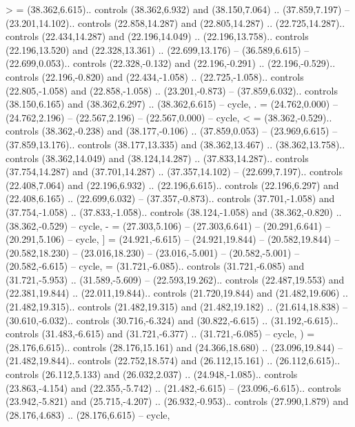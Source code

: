 {>} = {(38.362,6.615).. controls (38.362,6.932) and (38.150,7.064) .. (37.859,7.197) -- (23.201,14.102).. controls (22.858,14.287) and (22.805,14.287) .. (22.725,14.287).. controls (22.434,14.287) and (22.196,14.049) .. (22.196,13.758).. controls (22.196,13.520) and (22.328,13.361) .. (22.699,13.176) -- (36.589,6.615) -- (22.699,0.053).. controls (22.328,-0.132) and (22.196,-0.291) .. (22.196,-0.529).. controls (22.196,-0.820) and (22.434,-1.058) .. (22.725,-1.058).. controls (22.805,-1.058) and (22.858,-1.058) .. (23.201,-0.873) -- (37.859,6.032).. controls (38.150,6.165) and (38.362,6.297) .. (38.362,6.615) -- cycle},
{.} = {(24.762,0.000) -- (24.762,2.196) -- (22.567,2.196) -- (22.567,0.000) -- cycle},
{<} = {(38.362,-0.529).. controls (38.362,-0.238) and (38.177,-0.106) .. (37.859,0.053) -- (23.969,6.615) -- (37.859,13.176).. controls (38.177,13.335) and (38.362,13.467) .. (38.362,13.758).. controls (38.362,14.049) and (38.124,14.287) .. (37.833,14.287).. controls (37.754,14.287) and (37.701,14.287) .. (37.357,14.102) -- (22.699,7.197).. controls (22.408,7.064) and (22.196,6.932) .. (22.196,6.615).. controls (22.196,6.297) and (22.408,6.165) .. (22.699,6.032) -- (37.357,-0.873).. controls (37.701,-1.058) and (37.754,-1.058) .. (37.833,-1.058).. controls (38.124,-1.058) and (38.362,-0.820) .. (38.362,-0.529) -- cycle},
{-} = {(27.303,5.106) -- (27.303,6.641) -- (20.291,6.641) -- (20.291,5.106) -- cycle},
{]} = {(24.921,-6.615) -- (24.921,19.844) -- (20.582,19.844) -- (20.582,18.230) -- (23.016,18.230) -- (23.016,-5.001) -- (20.582,-5.001) -- (20.582,-6.615) -- cycle},
{\ctpbackslash} = {(31.721,-6.085).. controls (31.721,-6.085) and (31.721,-5.953) .. (31.589,-5.609) -- (22.593,19.262).. controls (22.487,19.553) and (22.381,19.844) .. (22.011,19.844).. controls (21.720,19.844) and (21.482,19.606) .. (21.482,19.315).. controls (21.482,19.315) and (21.482,19.182) .. (21.614,18.838) -- (30.610,-6.032).. controls (30.716,-6.324) and (30.822,-6.615) .. (31.192,-6.615).. controls (31.483,-6.615) and (31.721,-6.377) .. (31.721,-6.085) -- cycle},
{)} = {(28.176,6.615).. controls (28.176,15.161) and (24.366,18.680) .. (23.096,19.844) -- (21.482,19.844).. controls (22.752,18.574) and (26.112,15.161) .. (26.112,6.615).. controls (26.112,5.133) and (26.032,2.037) .. (24.948,-1.085).. controls (23.863,-4.154) and (22.355,-5.742) .. (21.482,-6.615) -- (23.096,-6.615).. controls (23.942,-5.821) and (25.715,-4.207) .. (26.932,-0.953).. controls (27.990,1.879) and (28.176,4.683) .. (28.176,6.615) -- cycle},
